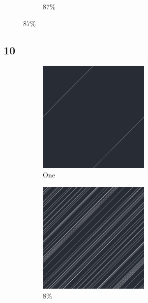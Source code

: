 \documentclass[12pt, fleqn]{report}                             %
\theoremstyle{break}                                            %
\begin{document}
\begin{figure}[ht!]
\begin{subfigure}[b]{0.4\linewidth}
          \caption{87\%}
        \end{subfigure}
      \end{figure}


      \clearpage
      \subsection{10}
      \begin{figure}[ht!]
        \centering
        \begin{subfigure}[b]{0.4\linewidth}
          \includegraphics[width=0.6\textwidth]{Images/10/a.png}
          \caption{One}
        \end{subfigure}
        \begin{subfigure}[b]{0.4\linewidth}
          \includegraphics[width=0.6\textwidth]{Images/10/b.png}
          \caption{8\%}
        \end{subfigure}
        \begin{subfigure}[b]{0.4\linewidth}

\end{subfigure}
\end{figure}
\end{document}
